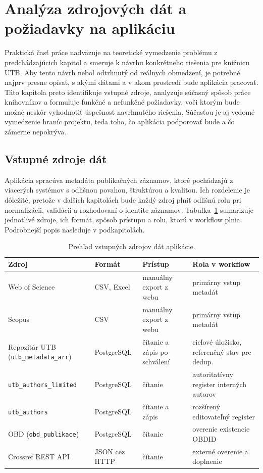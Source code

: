 
\section{Analýza zdrojových dát a požiadavky na aplikáciu}

Praktická časť práce nadväzuje na teoretické vymedzenie problému z predchádzajúcich kapitol a smeruje k návrhu konkrétneho riešenia pre knižnicu UTB. Aby tento návrh nebol odtrhnutý od reálnych obmedzení, je potrebné najprv presne opísať, s akými dátami a v akom prostredí bude aplikácia pracovať. Táto kapitola preto identifikuje vstupné zdroje, analyzuje súčasný spôsob práce knihovníkov a formuluje funkčné a nefunkčné požiadavky, voči ktorým bude možné neskôr vyhodnotiť úspešnosť navrhnutého riešenia. Súčasťou je aj vedomé vymedzenie hraníc projektu, teda toho, čo aplikácia podporovať bude a čo zámerne nepokrýva.

\subsection{Vstupné zdroje dát}

Aplikácia spracúva metadáta publikačných záznamov, ktoré pochádzajú z viacerých systémov s odlišnou povahou, štruktúrou a kvalitou. Ich rozdelenie je dôležité, pretože v ďalších kapitolách bude každý zdroj plniť odlišnú rolu pri normalizácii, validácii a rozhodovaní o identite záznamov. Tabuľka~\ref{tab:vstupne-zdroje} sumarizuje jednotlivé zdroje, ich formát, spôsob prístupu a rolu, ktorú v workflow plnia. Podrobnejší popis nasleduje v podkapitolách.

\begin{table}[h]
\centering
\caption{Prehľad vstupných zdrojov dát aplikácie.}
\label{tab:vstupne-zdroje}
\begin{tabular}{|p{3.2cm}|p{2.6cm}|p{3.2cm}|p{4.2cm}|}
\hline
\textbf{Zdroj} & \textbf{Formát} & \textbf{Prístup} & \textbf{Rola v workflow} \\
\hline
Web of Science & CSV, Excel & manuálny export z webu & primárny vstup metadát \\
\hline
Scopus & CSV & manuálny export z webu & primárny vstup metadát \\
\hline
Repozitár UTB (\texttt{utb\_metadata\_arr}) & PostgreSQL & čítanie a zápis po schválení & cieľové úložisko, referenčný stav pre dedup. \\
\hline
\texttt{utb\_authors\_limited} & PostgreSQL & čítanie & autoritatívny register interných autorov \\
\hline
\texttt{utb\_authors} & PostgreSQL & čítanie a zápis & rozšírený editovateľný register \\
\hline
OBD (\texttt{obd\_publikace}) & PostgreSQL & čítanie & overenie existencie OBDID \\
\hline
Crossref REST API & JSON cez HTTP & čítanie & externé overenie a doplnenie \\
\hline
\end{tabular}
\end{table}


